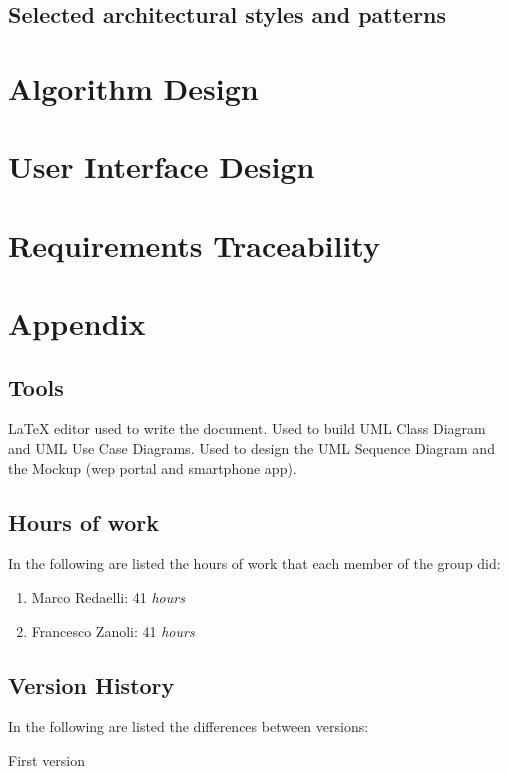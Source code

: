 \documentclass{../Common/Structure/doc_pdf}
\begin{document}
\section{Selected architectural styles and patterns}


\chapter{Algorithm Design}

\chapter{User Interface Design}

\chapter{Requirements Traceability}


\appendix
\chapter{Appendix}

\section{Tools}
\begin{itemize}
	 \LaTeX{} editor used to write the document.
	 Used to build UML Class Diagram and UML Use Case Diagrams.
	 Used to design the UML Sequence Diagram and the Mockup (wep portal and smartphone app).
\end{itemize}
\newpage
\section{Hours of work}
In the following are listed the hours of work that each member of the group did:
\begin{enumerate}
	\item Marco Redaelli: 41 \emph{hours}
	\item Francesco Zanoli: 41 \emph{hours}
\end{enumerate}
\newpage
\section{Version History}
In the following are listed the differences between versions:
\begin{enumerate}
	 First version
\end{enumerate}
\end{document}
